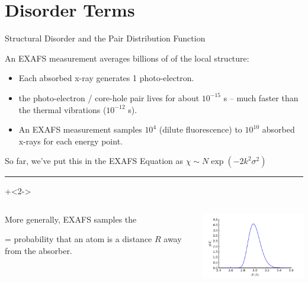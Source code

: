 \section{Disorder Terms}


\begin{slide}{Structural Disorder and the Pair Distribution Function}

  \begin{cenpage}{135mm}

  An EXAFS measurement averages billions of {} of the
  local structure:

\begin{cenpage}{88mm}
\begin{itemize}
\item Each absorbed x-ray generates 1 photo-electron.
\item the photo-electron / core-hole pair lives for about
  $10^{-15}$ s --  much faster than the thermal vibrations ($10^{-12}$ s).
\item An EXAFS measurement samples $10^4$ (dilute fluorescence) to $10^{10}$
  absorbed x-rays for each energy point.
\end{itemize}
\end{cenpage}

\vmm
 \vmm

So far, we've put this in the EXAFS Equation as \hspace{2mm}
$\chi \sim N \exp({-2k^2\sigma^2}) $

\vmm \hrule \vmm \onslide+<2->

\begin{columns}
  \begin{column}{70mm}
    More generally, EXAFS samples the

    \vmm
    {}

    \vmm

    {} =   probability that an
    atom is a distance $R$ away from the absorber.

    \vspace{8mm}

    \end{column}
  \begin{column}{65mm}

    \includegraphics[width=60mm]{figs/errors/gnxas}
    \end{column}
  \end{columns}
\end{cenpage}
\end{slide}


